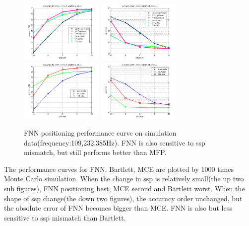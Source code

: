 \begin{figure}
\includegraphics[width=4cm,height=3cm]{figure/Accuracy_to_SNR_FNN_vs_Bartlett_MCE}
\includegraphics[width=4cm,height=3cm]{figure/Error_to_SNR_FNN_vs_Bartlett_MCE}
\includegraphics[width=4cm,height=3cm]{figure/Accuracy_to_SNR_FNN_vs_Bartlett_MCE_i906}
\includegraphics[width=4cm,height=3cm]{figure/Error_to_SNR_FNN_vs_Bartlett_MCE_i906}
\caption{FNN positioning performance curve on simulation data(frequency:109,232,385Hz).
 FNN is also sensitive to ssp mismatch, but still performs better than MFP.
}
\end{figure}

The performance curves for FNN, Bartlett, MCE are plotted by 1000 times Monte Carlo simulation. When the change in ssp is relatively small(the up two sub figures), FNN positioning best, MCE second and Bartlett worst.
When the shape of ssp change(the down two figures), the accuracy order unchanged, but the absolute error of FNN becomes bigger than MCE. FNN is also but less sensitive to ssp mismatch than Bartlett.

